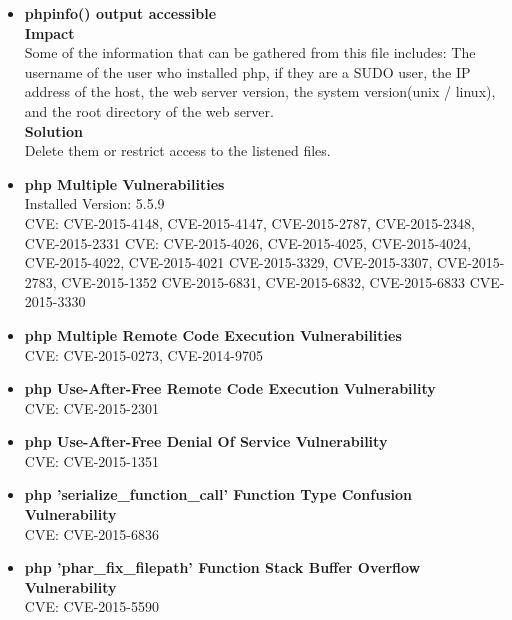 \begin{itemize}
\item \textbf{phpinfo() output accessible}\\

\textbf{Impact}\\
Some of the information that can be gathered from this file includes: The username of the user who installed php, if they are a SUDO user, the IP address of the host, the web server version, the system version(unix / linux), and the root directory of the web server.\\

\textbf{Solution}\\
Delete them or restrict access to the listened files.\\

\item \textbf{php Multiple Vulnerabilities} \\
Installed Version: 5.5.9\\


CVE: CVE-2015-4148, CVE-2015-4147, CVE-2015-2787, CVE-2015-2348, CVE-2015-2331 CVE: CVE-2015-4026, CVE-2015-4025, CVE-2015-4024, CVE-2015-4022, CVE-2015-4021 CVE-2015-3329, CVE-2015-3307, CVE-2015-2783, CVE-2015-1352 CVE-2015-6831, CVE-2015-6832, CVE-2015-6833 CVE-2015-3330\\


\item \textbf{php Multiple Remote Code Execution Vulnerabilities} \\
CVE: CVE-2015-0273, CVE-2014-9705 \\


\item \textbf{php Use-After-Free Remote Code Execution Vulnerability } \\
CVE: CVE-2015-2301\\



\item \textbf{php Use-After-Free Denial Of Service Vulnerability} \\
CVE: CVE-2015-1351\\


\item \textbf{php 'serialize\_function\_call' Function Type Confusion Vulnerability} \\
CVE: CVE-2015-6836\\


\item \textbf{php 'phar\_fix\_filepath' Function Stack Buffer Overflow Vulnerability} \\
CVE: CVE-2015-5590\\



\end{itemize}
